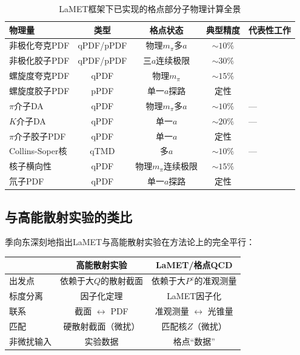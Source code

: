 \documentclass[12pt,a4paper]{ctexart}
\theoremstyle{definition}
\begin{document}
\begin{table}[H]
\centering
\caption{LaMET框架下已实现的格点部分子物理计算全景}
\label{tab:LaMET_applications}
\begin{tabular}{lcccl}
\toprule
物理量 & 类型 & 格点状态 & 典型精度 & 代表性工作 \\
\midrule
非极化夸克PDF & qPDF/pPDF & 物理$m_\pi$多$a$ & $\sim10\%$ & \cite{Liu2019isovector,LP3helicity} \\
非极化胶子PDF & qPDF/pPDF & 三$a$连续极限 & $\sim30\%$ & \cite{Chen2025gluon,NieMiera2025} \\
螺旋度夸克PDF & qPDF & 物理$m_\pi$ & $\sim15\%$ & \cite{LP3helicity} \\
螺旋度胶子PDF & pPDF & 单一$a$探路 & 定性 & \cite{Egerer2022} \\
$\pi$介子DA & qPDF & 物理$m_\pi$多$a$ & $\sim10\%$ & — \\
$K$介子DA & qPDF & 单一$a$ & $\sim20\%$ & — \\
$\pi$介子胶子PDF & qPDF & 单一$a$ & 定性 & \cite{Fan2023pion} \\
Collins-Soper核 & qTMD & 多$a$ & $\sim10\%$ & — \\
核子横向性 & qPDF & 物理$m_\pi$连续极限 & $\sim15\%$ & \cite{Chu2024transversity} \\
氘子PDF & qPDF & 单一$a$探路 & 定性 & \cite{Chu2024deuteron} \\
\bottomrule
\end{tabular}
\end{table}

\subsection{与高能散射实验的类比}

季向东\cite{Ji2014LaMET}深刻地指出LaMET与高能散射实验在方法论上的完全平行：

\begin{center}
\begin{tabular}{lcc}
\toprule
& 高能散射实验 & LaMET/格点QCD \\
\midrule
出发点        & 依赖于大$Q$的散射截面 & 依赖于大$P^z$的准观测量 \\
标度分离      & 因子化定理               & LaMET因子化 \\
联系          & 截面 $\leftrightarrow$ PDF & 准观测量 $\leftrightarrow$ 光锥量 \\
匹配          & 硬散射截面（微扰）       & 匹配核$Z$（微扰） \\
非微扰输入    & 实验数据                 & 格点``数据'' \\
\bottomrule
\end{tabular}
\end{center}
\end{document}

